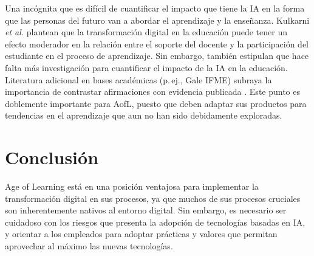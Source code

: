 \documentclass[conference]{IEEEtran}
\begin{document}
Una incógnita que es difícil de cuantificar el impacto que tiene la IA en la forma que las personas del futuro van a abordar el aprendizaje y la enseñanza. Kulkarni \emph{et al.} \cite{kulkarni2025edtech} plantean que la transformación digital en la educación puede tener un efecto moderador en la relación entre el soporte del docente y la participación del estudiante en el proceso de aprendizaje. Sin embargo, también estipulan que hace falta más investigación para cuantificar el impacto de la IA en la educación. Literatura adicional en bases académicas (p.\,ej., Gale IFME) subraya la importancia de contrastar afirmaciones con evidencia publicada \cite{galeA868660101}. Este punto es doblemente importante para AofL, puesto que deben adaptar sus productos para tendencias en el aprendizaje que aun no han sido debidamente exploradas.

\section{Conclusión}
Age of Learning está en una posición ventajosa para implementar la transformación digital en sus procesos, ya que muchos de sus procesos cruciales son inherentemente nativos al entorno digital. Sin embargo, es necesario ser cuidadoso con los riesgos que presenta la adopción de tecnologías basadas en IA, y orientar a los empleados para adoptar prácticas y valores que permitan aprovechar al máximo las nuevas tecnologías.
\end{document}
